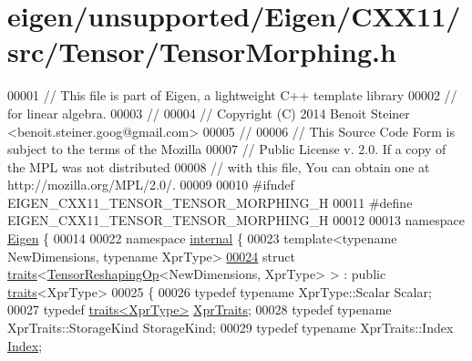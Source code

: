 \hypertarget{eigen_2unsupported_2_eigen_2_c_x_x11_2src_2_tensor_2_tensor_morphing_8h_source}{}\section{eigen/unsupported/\+Eigen/\+C\+X\+X11/src/\+Tensor/\+Tensor\+Morphing.h}
\label{eigen_2unsupported_2_eigen_2_c_x_x11_2src_2_tensor_2_tensor_morphing_8h_source}

\begin{DoxyCode}
00001 \textcolor{comment}{// This file is part of Eigen, a lightweight C++ template library}
00002 \textcolor{comment}{// for linear algebra.}
00003 \textcolor{comment}{//}
00004 \textcolor{comment}{// Copyright (C) 2014 Benoit Steiner <benoit.steiner.goog@gmail.com>}
00005 \textcolor{comment}{//}
00006 \textcolor{comment}{// This Source Code Form is subject to the terms of the Mozilla}
00007 \textcolor{comment}{// Public License v. 2.0. If a copy of the MPL was not distributed}
00008 \textcolor{comment}{// with this file, You can obtain one at http://mozilla.org/MPL/2.0/.}
00009 
00010 \textcolor{preprocessor}{#ifndef EIGEN\_CXX11\_TENSOR\_TENSOR\_MORPHING\_H}
00011 \textcolor{preprocessor}{#define EIGEN\_CXX11\_TENSOR\_TENSOR\_MORPHING\_H}
00012 
00013 \textcolor{keyword}{namespace }\hyperlink{namespace_eigen}{Eigen} \{
00014 
00022 \textcolor{keyword}{namespace }\hyperlink{namespaceinternal}{internal} \{
00023 \textcolor{keyword}{template}<\textcolor{keyword}{typename} NewDimensions, \textcolor{keyword}{typename} XprType>
\hyperlink{struct_eigen_1_1internal_1_1traits_3_01_tensor_reshaping_op_3_01_new_dimensions_00_01_xpr_type_01_4_01_4}{00024} \textcolor{keyword}{struct }\hyperlink{struct_eigen_1_1internal_1_1traits}{traits}<\hyperlink{class_eigen_1_1_tensor_reshaping_op}{TensorReshapingOp}<NewDimensions, XprType> > : \textcolor{keyword}{public} 
      \hyperlink{struct_eigen_1_1internal_1_1traits}{traits}<XprType>
00025 \{
00026   \textcolor{keyword}{typedef} \textcolor{keyword}{typename} XprType::Scalar Scalar;
00027   \textcolor{keyword}{typedef} \hyperlink{struct_eigen_1_1internal_1_1traits}{traits<XprType>} \hyperlink{struct_eigen_1_1internal_1_1traits}{XprTraits};
00028   \textcolor{keyword}{typedef} \textcolor{keyword}{typename} XprTraits::StorageKind StorageKind;
00029   \textcolor{keyword}{typedef} \textcolor{keyword}{typename} XprTraits::Index \hyperlink{namespace_eigen_a62e77e0933482dafde8fe197d9a2cfde}{Index};

\end{DoxyCode}
